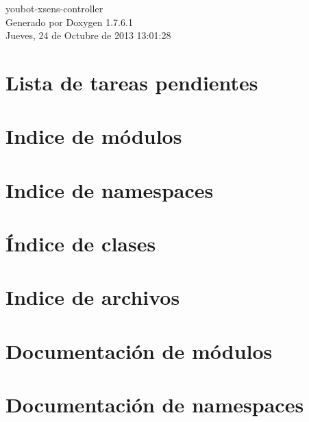 \documentclass[a4paper]{book}
\begin{document}
\hypersetup{pageanchor=false,citecolor=blue}
\begin{titlepage}
\vspace*{7cm}
\begin{center}
{\Large youbot-\/xsens-\/controller }\\
\vspace*{1cm}
{\large \-Generado por Doxygen 1.7.6.1}\\
\vspace*{0.5cm}
{\small Jueves, 24 de Octubre de 2013 13:01:28}\\
\end{center}
\end{titlepage}
\clearemptydoublepage
{}
\tableofcontents
\clearemptydoublepage
{}
\hypersetup{pageanchor=true,citecolor=blue}
\chapter{\-Lista de tareas pendientes}
\label{todo}
\hypertarget{todo}{}

\chapter{\-Indice de módulos}

\chapter{\-Indice de namespaces}

\chapter{Índice de clases}

\chapter{\-Indice de archivos}

\chapter{\-Documentación de módulos}

\chapter{\-Documentación de namespaces}


\end{document}
